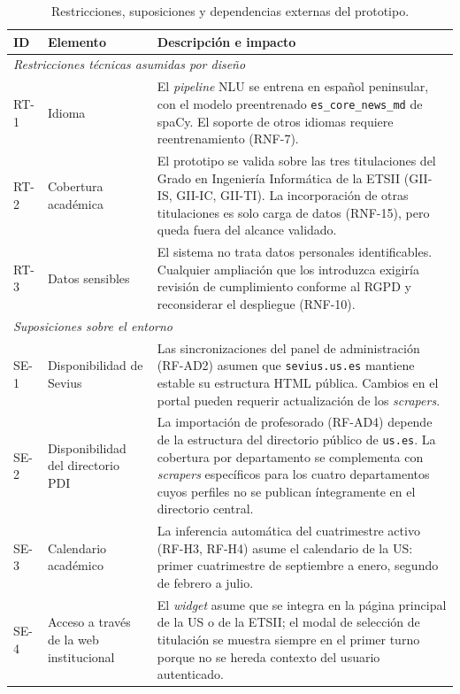 \begin{table}[hbtp]
\centering
\small
\caption{Restricciones, suposiciones y dependencias externas del prototipo.}\label{tab:restricciones}
\begin{tabular}{|p{1.2cm}|p{3.6cm}|p{8.0cm}|}
\hline
\textbf{ID} & \textbf{Elemento} & \textbf{Descripción e impacto} \\ \hline
\multicolumn{3}{|l|}{\textit{Restricciones técnicas asumidas por diseño}} \\ \hline
RT-1 & Idioma & El \textit{pipeline} NLU se entrena en español peninsular, con el modelo preentrenado \texttt{es\_core\_news\_md} de spaCy. El soporte de otros idiomas requiere reentrenamiento (RNF-7). \\ \hline
RT-2 & Cobertura académica & El prototipo se valida sobre las tres titulaciones del Grado en Ingeniería Informática de la ETSII (GII-IS, GII-IC, GII-TI). La incorporación de otras titulaciones es solo carga de datos (RNF-15), pero queda fuera del alcance validado. \\ \hline
RT-3 & Datos sensibles & El sistema no trata datos personales identificables. Cualquier ampliación que los introduzca exigiría revisión de cumplimiento conforme al RGPD y reconsiderar el despliegue (RNF-10). \\ \hline
\multicolumn{3}{|l|}{\textit{Suposiciones sobre el entorno}} \\ \hline
SE-1 & Disponibilidad de Sevius & Las sincronizaciones del panel de administración (RF-AD2) asumen que \texttt{sevius.us.es} mantiene estable su estructura HTML pública. Cambios en el portal pueden requerir actualización de los \textit{scrapers}. \\ \hline
SE-2 & Disponibilidad del directorio PDI & La importación de profesorado (RF-AD4) depende de la estructura del directorio público de \texttt{us.es}. La cobertura por departamento se complementa con \textit{scrapers} específicos para los cuatro departamentos cuyos perfiles no se publican íntegramente en el directorio central. \\ \hline
SE-3 & Calendario académico & La inferencia automática del cuatrimestre activo (RF-H3, RF-H4) asume el calendario de la US: primer cuatrimestre de septiembre a enero, segundo de febrero a julio. \\ \hline
SE-4 & Acceso a través de la web institucional & El \textit{widget} asume que se integra en la página principal de la US o de la ETSII; el modal de selección de titulación se muestra siempre en el primer turno porque no se hereda contexto del usuario autenticado. \\ \hline

\end{tabular}
\end{table}
